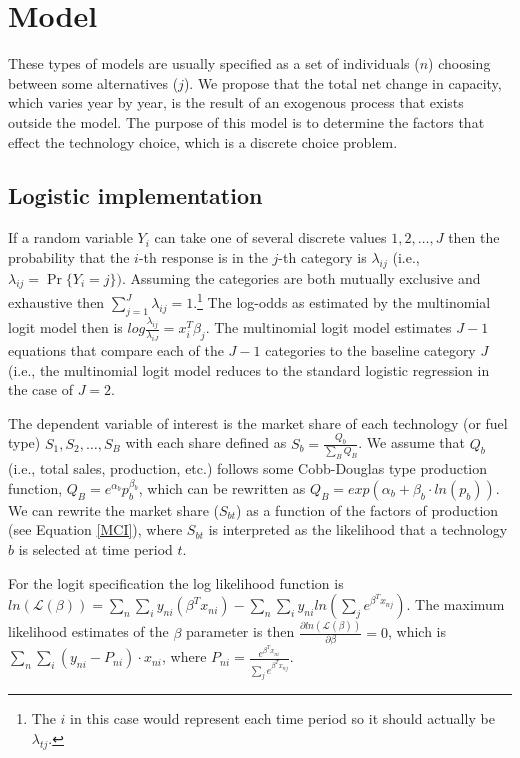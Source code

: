\documentclass[10pt]{amsart}
\begin{document}
\section{Model}
These types of models are usually specified as a set of individuals ($n$) choosing between some alternatives ($j$).
We propose that the total net change in capacity, which varies year by year, is the result of an exogenous process that exists outside the model. 
The purpose of this model is to determine the factors that effect the technology choice, which is a discrete choice problem.

\subsection{Logistic implementation}
If a random variable $Y_{i}$ can take one of several discrete values $1, 2, \ldots, J$ then the probability that the $i$-th response is in the $j$-th category is $\lambda_{ij}$ (i.e., $\lambda_{ij} = \Pr\{Y_{i} = j\})$. 
Assuming the categories are both mutually exclusive and exhaustive then $\sum_{j=1}^J \lambda_{ij} = 1$.\footnote{The $i$ in this case would represent each time period so it should actually be $\lambda_{tj}$.} 
The log-odds as estimated by the multinomial logit model then is $log \frac{\lambda_{ij}}{\lambda_{iJ}} = x_{i}^T \beta_j$.
The multinomial logit model estimates $J - 1$ equations that compare each of the $J - 1$ categories to the baseline category $J$ (i.e., the multinomial logit model reduces to the standard logistic regression in the case of $J=2$. 

The dependent variable of interest is the market share of each technology (or fuel type) \textit{$S_1, S_2, \ldots, S_B$} with each share defined as $S_b = \frac{Q_b}{\sum_B Q_B}$.
We assume that $Q_b$ (i.e., total sales, production, etc.) follows some Cobb-Douglas type production function, $Q_B = e^{\alpha_b}p_{b}^{\beta_b}$, which can be rewritten as $Q_B = exp\left(\alpha_b + \beta_b \cdot ln(p_b)\right)$.
We can rewrite the market share ($S_{bt}$) as a function of the factors of production (see Equation \ref{MCI}), where $S_{bt}$ is interpreted as the likelihood that a technology $b$ is selected at time period $t$.  

For the logit specification the log likelihood function is $ln(\mathcal{L(\beta)})= \sum_{n} \sum_{i} y_{ni}\left(\beta^{T} x_{ni}\right) - \sum_{n} \sum_{i} y_{ni} ln\left(\sum_{j}e^{\beta^{T}x_{nj}}\right)$.
The maximum likelihood estimates of the $\beta$ parameter is then $\frac{\partial ln\left(\mathcal{L(\beta)}\right)}{\partial \beta} = 0$, which is $\sum_{n}\sum_{i} \left(y_{ni} - P_{ni}\right)\cdot x_{ni}$, where $P_{ni} = \frac{e^{\beta^{T}x_{ni}}}{\sum_{j} e^{\beta^{T}x_{nj}}}$.
\end{document}
